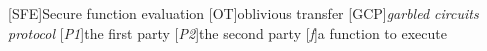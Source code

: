 \usepackage{acronym}

[SFE]{Secure function evaluation}
[OT]{oblivious transfer}
[GCP]{\emph{garbled circuits protocol}}
[\emph{P1}]{the first party}
[\emph{P2}]{the second party}
[\emph{f}]{a function to execute}

\newcommand{\ponein}{$i_{P1}$}
\newcommand{\ptwoin}{$i_{P2}$}

